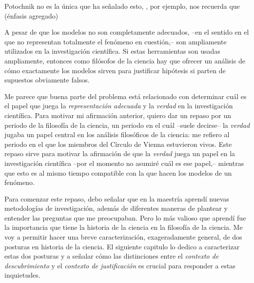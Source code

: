 Potochnik no es la única que ha señalado esto,
\textcite[p.24]{abrams2023evolution}, por ejemplo, nos
recuerda que  (énfasis agregado)

A pesar de que los modelos no son completamente adecuados,
--en el sentido en el que no representan totalmente el
fenómeno en cuestión,-- son ampliamente utilizados en la
investigación científica. Si estas herramientas son usadas
ampliamente, entonces como filósofos de la ciencia hay que
ofrecer un análisis de cómo exactamente los modelos sirven
para justificar hipótesis si parten de supuestos obviamente
falsos.

Me parece que buena parte del problema está relacionado con
determinar cuál es el papel que juega la
\emph{representación adecuada} y la \emph{verdad} en la
investigación científica. Para motivar mi afirmación
anterior, quiero dar un repaso por un periodo de la
filosofía de la ciencia, un periodo en el cuál --suele
decirse-- la \emph{verdad} jugaba un papel central en los
análisis filosóficos de la ciencia: me refiero al periodo en
el que los miembros del Círculo de Vienna estuvieron vivos.
Este repaso sirve para motivar la afirmación de que la
\emph{verdad} juega un papel en la investigación científica
--por el momento no asumiré cuál es ese papel,-- mientras
que esto es al mismo tiempo compatible con la
 que hacen los modelos de un
fenómeno.

Para comenzar este repaso, debo señalar que en la maestría
aprendí nuevas metodologías de investigación, además de
diferentes maneras de plantear y entender las preguntas que
me preocupaban. Pero lo más valioso que aprendí fue la
importancia que tiene la historia de la ciencia en la
filosofía de la ciencia. Me voy a permitir hacer una breve
caracterización, exageradamente general, de dos posturas en
historia de la ciencia. El siguiente capitulo lo dedico a
caracterizar estas dos posturas y a señalar cómo las
distinciones entre el \emph{contexto de descubrimiento} y el
\emph{contexto de justificación} es crucial para responder a
estas inquietudes.







